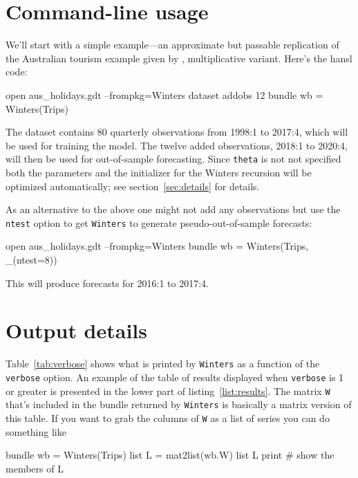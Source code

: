 \documentclass{article}
\begin{document}
\section{Command-line usage}
\label{sec:auto}

We'll start with a simple example---an approximate but passable
replication of the Australian tourism example given by
\cite{hyndman2021}, multiplicative variant. Here's the hansl
code:\label{pg:ex1}
\begin{nscode}
open aus_holidays.gdt --frompkg=Winters
dataset addobs 12
bundle wb = Winters(Trips)
\end{nscode}

The  dataset contains 80 quarterly observations from
1998:1 to 2017:4, which will be used for training the model. The twelve
added observations, 2018:1 to 2020:4, will then be used for
out-of-sample forecasting. Since \texttt{theta} is not not specified
both the parameters and the initializer for the Winters recursion
will be optimized automatically; see section~\ref{sec:details} for
details.

As an alternative to the above one might not add any observations but
use the \texttt{ntest} option to get \texttt{Winters} to generate
pseudo-out-of-sample forecasts:
\begin{nscode}
open aus_holidays.gdt --frompkg=Winters
bundle wb = Winters(Trips, _(ntest=8))
\end{nscode}
This will produce forecasts for 2016:1 to 2017:4.

\section{Output details}
\label{sec:out}

Table~\ref{tab:verbose} shows what is printed by \texttt{Winters} as a
function of the \texttt{verbose} option. An example of the table of
results displayed when \texttt{verbose} is 1 or greater is presented
in the lower part of listing~\ref{list:results}. The matrix \texttt{W}
that's included in the bundle returned by \texttt{Winters} is
basically a matrix version of this table. If you want to grab the
columns of \texttt{W} as a list of series you can do something like
\begin{nscode}
bundle wb = Winters(Trips)
list L = mat2list(wb.W)
list L print # show the members of L
\end{nscode}
\end{document}
